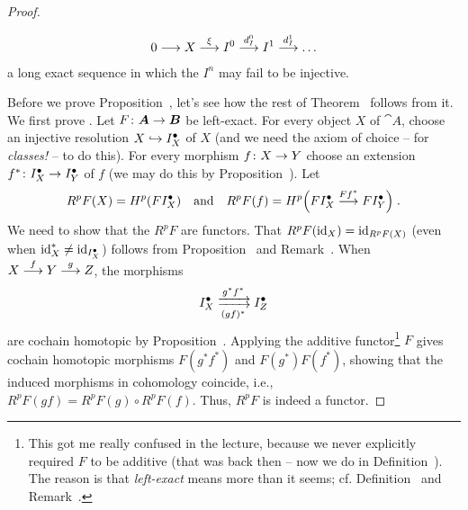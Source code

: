 \documentclass[a4paper,parskip=half,numbers=enddot, DIV=12]{scrreprt}
\begin{document}
\begin{proof}
\begin{rem}
\begin{alphanumerate}
\begin{align*}
					0\morphism X\morphism[\xi]I^0\morphism[d_I^0]I^1\morphism[d_I^1]\ldots 
				\end{align*}
				a long exact sequence in which the $I^n$ may fail to be injective. 
			\end{alphanumerate}
		\end{rem}
		Before we prove Proposition~, let's see how the rest of Theorem~ follows from it. We first prove . Let $F\colon{\cat A}\morphism {\cat B}$ be left-exact. For every object $X$ of ${\cat A}$, choose an injective resolution $X\monomorphism I_X^\bullet $ of $X$ (and we need the axiom of choice -- for \emph{classes!} -- to do this). For every morphism $f\colon X\morphism Y$ choose an extension $f^*\colon I_X^\bullet \morphism I_Y^\bullet $ of $f$ (we may do this by Proposition~). Let
		\begin{align*}
			R^pF(X)=H^p(FI_X^\bullet )\quad\text{and}\quad R^pF(f)=H^p\Big(FI_X^\bullet \morphism[Ff^* ]FI_Y^\bullet \Big)\;.
		\end{align*}
		We need to show that the $R^pF$ are functors. That $R^pF(\operatorname{id}_X)=\operatorname{id}_{R^pF(X)}$ (even when $\operatorname{id}_X^* \neq \operatorname{id}_{I_X^\bullet }$) follows from Proposition~ and Remark~. When $X\morphism[f]Y\morphism[g]Z$, the morphisms 
		\begin{align*}
			I_X^\bullet \xdoublemorphism[g^* f^* ][(gf)^* ]I_Z^\bullet 
		\end{align*}
		are cochain homotopic by Proposition~. Applying the additive functor\footnote{This got me really confused in the lecture, because we never explicitly required $F$ to be additive (that was back then -- now we do in Definition~). The reason is that \emph{left-exact} means more than it seems; cf. Definition~ and Remark~.} $F$ gives cochain homotopic morphisms $F(g^* f^* )$ and $F(g^* )F(f^*)$, showing that the induced morphisms in cohomology coincide, i.e., $R^pF(gf)=R^pF(g)\circ R^pF(f)$. Thus, $R^pF$ is indeed a functor.
		

\end{proof}
\end{document}
